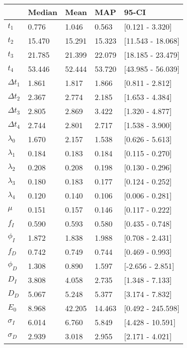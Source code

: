 \begin{tabular}{lllll}
\toprule
{} &  Median &    Mean &     MAP &              95-CI \\
\midrule
$t_1$        &   0.776 &   1.046 &   0.563 &    [0.121 - 3.320] \\
$t_2$        &  15.470 &  15.291 &  15.323 &  [11.543 - 18.068] \\
$t_3$        &  21.785 &  21.399 &  22.079 &  [18.185 - 23.479] \\
$t_4$        &  53.446 &  52.444 &  53.720 &  [43.985 - 56.039] \\
$\Delta t_1$ &   1.861 &   1.817 &   1.866 &    [0.811 - 2.812] \\
$\Delta t_2$ &   2.367 &   2.774 &   2.185 &    [1.653 - 4.384] \\
$\Delta t_3$ &   2.805 &   2.869 &   3.422 &    [1.320 - 4.877] \\
$\Delta t_4$ &   2.744 &   2.801 &   2.717 &    [1.538 - 3.900] \\
$\lambda_0$  &   1.670 &   2.157 &   1.538 &    [0.626 - 5.613] \\
$\lambda_1$  &   0.184 &   0.183 &   0.184 &    [0.115 - 0.270] \\
$\lambda_2$  &   0.208 &   0.208 &   0.198 &    [0.130 - 0.296] \\
$\lambda_3$  &   0.180 &   0.183 &   0.177 &    [0.124 - 0.252] \\
$\lambda_4$  &   0.120 &   0.140 &   0.106 &    [0.006 - 0.281] \\
$\mu$        &   0.151 &   0.157 &   0.146 &    [0.117 - 0.222] \\
$f_I$        &   0.590 &   0.593 &   0.580 &    [0.435 - 0.748] \\
$\phi_I$     &   1.872 &   1.838 &   1.988 &    [0.708 - 2.431] \\
$f_D$        &   0.742 &   0.749 &   0.744 &    [0.469 - 0.993] \\
$\phi_D$     &   1.308 &   0.890 &   1.597 &   [-2.656 - 2.851] \\
$D_I$        &   3.808 &   4.058 &   2.735 &    [1.348 - 7.133] \\
$D_D$        &   5.067 &   5.248 &   5.377 &    [3.174 - 7.832] \\
$E_0$        &   8.968 &  42.205 &  14.463 &  [0.492 - 245.598] \\
$\sigma_I$   &   6.014 &   6.760 &   5.849 &   [4.428 - 10.591] \\
$\sigma_D$   &   2.939 &   3.018 &   2.955 &    [2.171 - 4.021] \\

\end{tabular}
